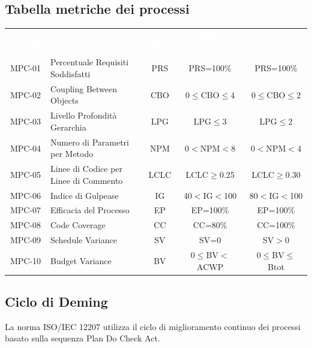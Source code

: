 \newpage
\subsection{Tabella metriche dei processi}
    \renewcommand{\arraystretch}{1.5}
    \begin{longtable}{ c C{4cm} c c c}
    \textcolor{white}{\textbf{Metrica}} & \textcolor{white}{\textbf{Nome}} & \textcolor{white}{\textbf{Sigla}} & \textcolor{white}{\textbf{Valore Accettabile}} & \textcolor{white}{\textbf{Valore Ottimale}}\\
    MPC-01 & Percentuale Requisiti Soddisfatti & PRS & PRS=100\% & PRS=100\% \\
    MPC-02 & Coupling Between Objects & CBO & 0$\leq$CBO$\leq$4 & 0$\leq$CBO$\leq$2 \\
    MPC-03 & Livello Profondità Gerarchia & LPG & LPG$\leq$3 & LPG$\leq$2\\
    MPC-04 & Numero di Parametri per Metodo & NPM & 0$<$NPM$<$8 & 0$<$NPM$<$4 \\
    MPC-05 & Linee di Codice per Linee di Commento & LCLC & LCLC$\geq$0.25 & LCLC$\geq$0.30 \\
    MPC-06 & Indice di Gulpease & IG & 40$<$IG$<$100 & 80$<$IG$<$100 \\
    MPC-07 & Efficacia del Processo & EP & EP=100\% & EP=100\%  \\
    MPC-08 & Code Coverage & CC & CC=80\% & CC=100\%  \\
    MPC-09 & Schedule Variance & SV & SV=0 & SV$>$0  \\	
    MPC-10 & Budget Variance & BV & 0$\leq$BV$<$ACWP  & 0$\leq$BV$\leq$Btot  \\	

    \end{longtable}

\subsection{Ciclo di Deming}
    La norma ISO/IEC 12207 utilizza il ciclo di miglioramento continuo dei processi basato sulla sequenza Plan Do Check Act.


